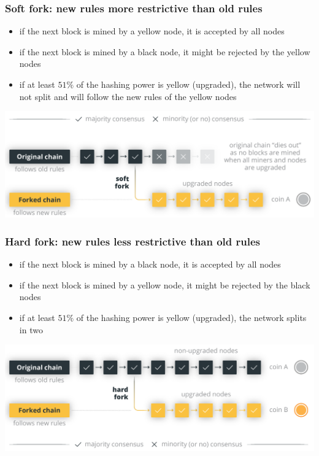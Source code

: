 \documentclass[11pt]{beamer}  %
\begin{document}
\begin{frame}\frametitle{Soft fork: new rules more restrictive than old rules}

  \begin{greenbox}{}
    \begin{itemize}
    \item if the next block is mined by a yellow node, it is accepted by all nodes
    \item if the next block is mined by a black node, it might be rejected by the yellow nodes
    \item if at least $51\%$ of the hashing power is yellow (upgraded), the network will not split and will follow
      the new rules of the yellow nodes
    \end{itemize}
  \end{greenbox}

  \bigskip

  \begin{center}
    \includegraphics[width=\textwidth,clip=false]{pictures/soft-fork.png}
  \end{center}

\end{frame}

\begin{frame}\frametitle{Hard fork: new rules less restrictive than old rules}

  \begin{redbox}{}
    \begin{itemize}
    \item if the next block is mined by a black node, it is accepted by all nodes
    \item if the next block is mined by a yellow node, it might be rejected by the black nodes
    \item if at least $51\%$ of the hashing power is yellow (upgraded), the network splits in two
    \end{itemize}
  \end{redbox}

  \bigskip

  \begin{center}
    \includegraphics[width=\textwidth,clip=false]{pictures/hard-fork.png}
  \end{center}
    
\end{frame}
\end{document}
